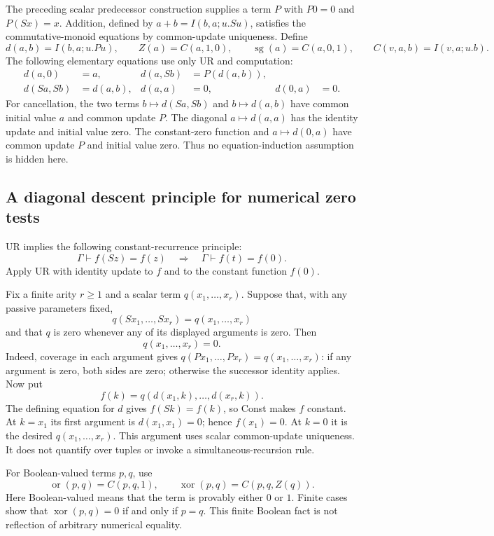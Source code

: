 \documentclass[11pt]{article}
\begin{document}
The preceding scalar predecessor construction supplies a term $P$ with
$P0=0$ and $P(Sx)=x$. Addition, defined by
$a+b=I(b,a;u.Su)$, satisfies the commutative-monoid equations by common-update
uniqueness. Define
\[
 d(a,b)=I(b,a;u.Pu),\qquad
 Z(a)=C(a,1,0),\qquad \operatorname{sg}(a)=C(a,0,1),
 \qquad C(v,a,b)=I(v,a;u.b).
\]
The following elementary equations use only UR and computation:
\begin{equation}
\begin{aligned}
 d(a,0)&=a,&d(a,Sb)&=P(d(a,b)),\\
 d(Sa,Sb)&=d(a,b),&d(a,a)&=0,&d(0,a)&=0.
\end{aligned}
 \label{eq:ur-monus-basics}
\end{equation}
For cancellation, the two terms $b\mapsto d(Sa,Sb)$ and $b\mapsto d(a,b)$
have common initial value $a$ and common update $P$. The diagonal
$a\mapsto d(a,a)$ has the identity update and initial value zero. The
constant-zero function and $a\mapsto d(0,a)$ have common update $P$ and
initial value zero. Thus no equation-induction assumption is hidden here.

\subsection{A diagonal descent principle for numerical zero tests}

UR implies the following constant-recurrence principle:
\[
 \Gamma\vdash f(Sz)=f(z)\quad\Longrightarrow\quad
 \Gamma\vdash f(t)=f(0).
 \tag{Const}
\]
Apply UR with identity update to $f$ and to the constant function $f(0)$.

Fix a finite arity $r\geq1$ and a scalar term $q(x_1,\ldots,x_r)$.
Suppose that, with any passive parameters fixed,
\[
 q(Sx_1,\ldots,Sx_r)=q(x_1,\ldots,x_r)
\]
and that $q$ is zero whenever any of its displayed arguments is zero.
Then
\[
                         q(x_1,\ldots,x_r)=0.             \tag{DD}
\]
Indeed, coverage in each argument gives
$q(Px_1,\ldots,Px_r)=q(x_1,\ldots,x_r)$: if any argument is zero,
both sides are zero; otherwise the successor identity applies.
Now put
\[
 f(k)=q(d(x_1,k),\ldots,d(x_r,k)).
\]
The defining equation for $d$ gives $f(Sk)=f(k)$, so Const makes $f$
constant. At $k=x_1$ its first argument is $d(x_1,x_1)=0$; hence
$f(x_1)=0$. At $k=0$ it is the desired $q(x_1,\ldots,x_r)$.
This argument uses scalar common-update uniqueness. It does not quantify over
tuples or invoke a simultaneous-recursion rule.

For Boolean-valued terms $p,q$, use
\[
 \operatorname{or}(p,q)=C(p,q,1),\qquad
 \operatorname{xor}(p,q)=C(p,q,Z(q)).
\]
Here Boolean-valued means that the term is provably either $0$ or $1$.
Finite cases show that $\operatorname{xor}(p,q)=0$ if and only if $p=q$.
This finite Boolean fact is not reflection of arbitrary numerical equality.
\end{document}
